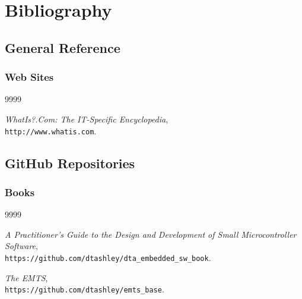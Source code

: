 
\chapter*{Bibliography}



\nocite{*}


\section*{General Reference}

\subsection*{Web Sites}

\begin{thecustombibliography}{9999}

\emph{WhatIs?.Com:  The IT-Specific Encyclopedia}, \\
\texttt{http://www.whatis.com}.

\end{thecustombibliography}


\section*{GitHub Repositories}

\subsection*{Books}

\begin{thecustombibliography}{9999}

\emph{A Practitioner's Guide to the Design and Development of Small Microcontroller Software}, \\
\texttt{https://github.com/dtashley/dta\_embedded\_sw\_book}.

\emph{The EMTS}, \\
\texttt{https://github.com/dtashley/emts\_base}.

\end{thecustombibliography}

